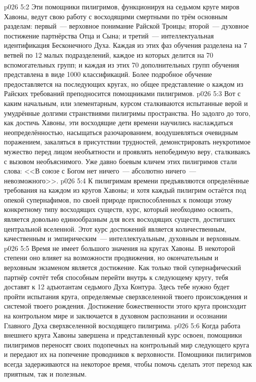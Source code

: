 \vs p026 5:2 Эти помощники пилигримов, функционируя на седьмом круге миров Хавоны, ведут свою работу с восходящими смертными по трём основным разделам: первый~--- верховное понимание Райской Троицы; второй~--- духовное постижение партнёрства Отца и Сына; и третий~--- интеллектуальная идентификация Бесконечного Духа. Каждая из этих фаз обучения разделена на 7 ветвей по 12 малых подразделений, каждое из которых делится на 70 вспомогательных групп; и каждая из этих 70 дополнительных групп обучения представлена в виде 1000 классификаций. Более подробное обучение предоставляется на последующих кругах, но общее представление о каждом из Райских требований преподносится помощниками пилигримов.
\vs p026 5:3 Вот с каким начальным, или элементарным, курсом сталкиваются испытанные верой и умудрённые долгими странствиями пилигримы пространства. Но задолго до того, как достичь Хавоны, эти восходящие дети времени научились наслаждаться неопределённостью, насыщаться разочарованием, воодушевляться очевидным поражением, закаляться в присутствии трудностей, демонстрировать неукротимое мужество перед лицом необъятности и проявлять непобедимую веру, сталкиваясь с вызовом необъяснимого. Уже давно боевым кличем этих пилигримов стали слова: <<В союзе с Богом нет ничего~--- абсолютно ничего~--- невозможного>>.
\vs p026 5:4 К пилигримам времени предъявляются определённые требования на каждом из кругов Хавоны; и хотя каждый пилигрим остаётся под опекой супернафимов, по своей природе приспособленных к помощи этому конкретному типу восходящих существ, курс, который необходимо освоить, является довольно единообразным для всех восходящих существ, достигших центральной вселенной. Этот курс достижений является количественным, качественным и эмпирическим~--- интеллектуальным, духовным и верховным.
\vs p026 5:5 Время не имеет большого значения на кругах Хавоны. В некоторой степени оно влияет на возможности продвижения, но окончательным и верховным экзаменом является достижение. Как только твой супернафический партнёр сочтёт тебя способным перейти внутрь к следующему кругу, тебя доставят к 12 адъютантам седьмого Духа Контура. Здесь тебе нужно будет пройти испытания круга, определяемые сверхвселенной твоего происхождения и системой твоего рождения. Достижение божественности этого круга происходит на контрольном мире и заключается в духовном распознании и осознании Главного Духа сверхвселенной восходящего пилигрима.
\vs p026 5:6 Когда работа внешнего круга Хавоны завершена и представленный курс освоен, помощники пилигримов переносят своих подопечных на контрольный мир следующего круга и передают их на попечение проводников к верховности. Помощники пилигримов всегда задерживаются на некоторое время, чтобы помочь сделать этот переход как приятным, так и полезным.
